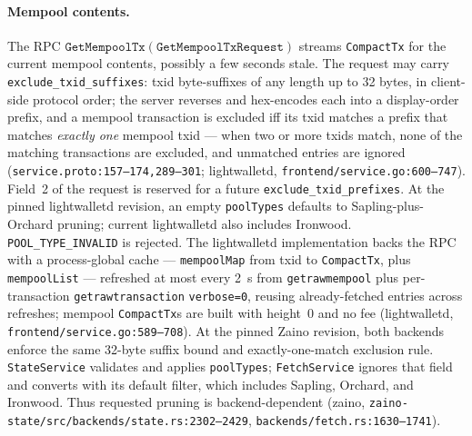 \documentclass[11pt,a4paper]{article}
\theoremstyle{definition}
\begin{document}
\paragraph{Mempool contents.} The RPC
$\mathtt{GetMempoolTx}(\mathtt{GetMempoolTxRequest})$ streams
\texttt{CompactTx} for the current mempool contents, possibly a few
seconds stale. The request may carry \texttt{exclude\_txid\_suffixes}:
txid byte-suffixes of any length up to 32 bytes, in client-side protocol
order; the server reverses and hex-encodes each into a display-order
prefix, and a mempool transaction is excluded iff its txid matches a
prefix that matches \emph{exactly one} mempool txid --- when two or more
txids match, none of the matching transactions are excluded, and
unmatched entries are ignored (\texttt{service.proto:157--174,289--301};
\textsf{lightwalletd}, \texttt{frontend/service.go:600--747}). Field~2 of
the request is reserved for a future \texttt{exclude\_txid\_prefixes}.
At the pinned lightwalletd revision, an empty \texttt{poolTypes} defaults
to Sapling-plus-Orchard pruning; current lightwalletd also includes
Ironwood. \texttt{POOL\_TYPE\_INVALID} is rejected. The lightwalletd
implementation backs the RPC with
a process-global cache --- \texttt{mempoolMap} from txid to
\texttt{CompactTx}, plus \texttt{mempoolList} --- refreshed at most every
2~s from \texttt{getrawmempool} plus per-transaction
\texttt{getrawtransaction} \texttt{verbose=0}, reusing already-fetched
entries across refreshes; mempool \texttt{CompactTx}s are built with
height~0 and no fee (\textsf{lightwalletd},
\texttt{frontend/service.go:589--708}). At the pinned Zaino revision,
both backends enforce the same 32-byte suffix bound and exactly-one-match
exclusion rule. \texttt{StateService} validates and applies
\texttt{poolTypes}; \texttt{FetchService} ignores that field and converts
with its default filter, which includes Sapling, Orchard, and Ironwood.
Thus requested pruning is backend-dependent
(\textsf{zaino}, \texttt{zaino-state/src/backends/state.rs:2302--2429},
\texttt{backends/fetch.rs:1630--1741}).
\end{document}
